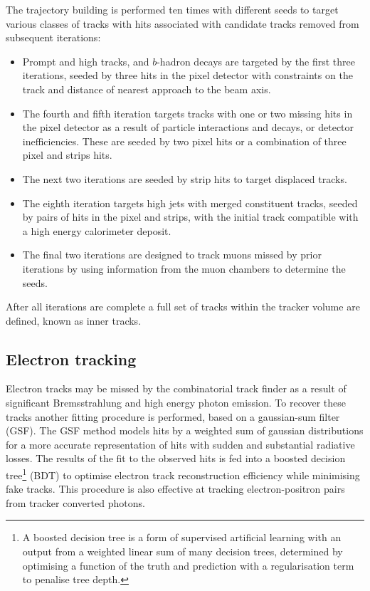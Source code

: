 The trajectory building is performed ten times with different seeds to target various classes of tracks with hits associated with candidate tracks removed from subsequent iterations:
\begin{itemize}
    \item Prompt and high \pt tracks, and $b$-hadron decays are targeted by the first three iterations, seeded by three hits in the pixel detector with constraints on the track \pt and distance of nearest approach to the beam axis.
    \item The fourth and fifth iteration targets tracks with one or two missing hits in the pixel detector as a result of particle interactions and decays, or detector inefficiencies. These are seeded by two pixel hits or a combination of three pixel and strips hits.
    \item The next two iterations are seeded by strip hits to target displaced tracks.
    \item The eighth iteration targets high \pt jets with merged constituent tracks, seeded by pairs of hits in the pixel and strips, with the initial track compatible with a high energy calorimeter deposit.
    \item The final two iterations are designed to track muons missed by prior iterations by using information from the muon chambers to determine the seeds.
\end{itemize}
After all iterations are complete a full set of tracks within the tracker volume are defined, known as inner tracks.


\subsection{Electron tracking}

Electron tracks may be missed by the combinatorial track finder as a result of significant Bremsstrahlung and high energy photon emission. To recover these tracks another fitting procedure is performed, based on a gaussian-sum filter (GSF). The GSF method models hits by a weighted sum of gaussian distributions for a more accurate representation of hits with sudden and substantial radiative losses. The results of the fit to the observed hits is fed into a boosted decision tree\footnote{A boosted decision tree is a form of supervised artificial learning with an output from a weighted linear sum of many decision trees, determined by optimising a function of the truth and prediction with a regularisation term to penalise tree depth.} (BDT) to optimise electron track reconstruction efficiency while minimising fake tracks. This procedure is also effective at tracking electron-positron pairs from tracker converted photons.


